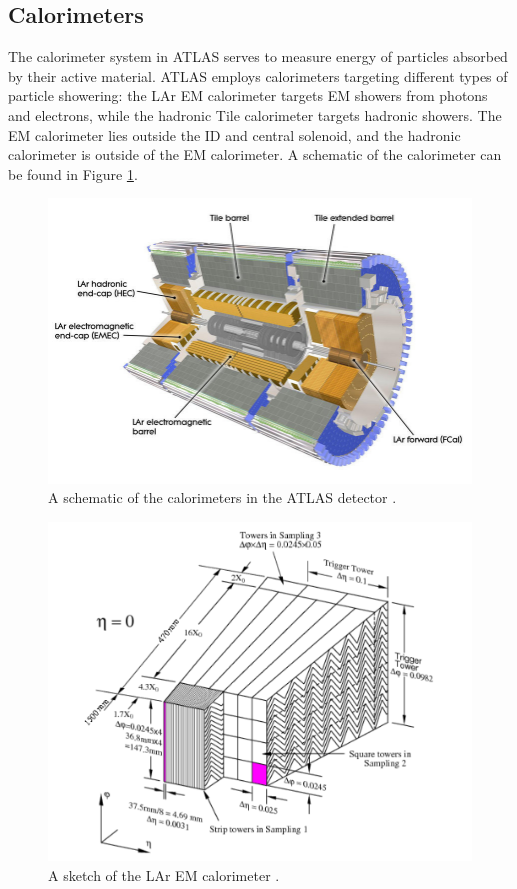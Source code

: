 \subsection{Calorimeters} \label{ssec:calorimeters}
The calorimeter system in ATLAS serves to measure energy of particles absorbed by their active material. ATLAS employs calorimeters targeting different types of particle showering: the \gls{LAr} \gls{EM} calorimeter targets \gls{EM} showers from photons and electrons, while the hadronic Tile calorimeter targets hadronic showers. The \gls{EM} calorimeter lies outside the \gls{ID} and central solenoid, and the hadronic calorimeter is outside of the \gls{EM} calorimeter.  A schematic of the calorimeter can be found in Figure \ref{fig:calorimeter}.


\begin{figure}[!ht]
    \centering
    \includegraphics[width=.7\textwidth]{chapters/chapter2_experiment/images/calorimeter.jpeg}
    \caption{A schematic of the calorimeters in the ATLAS detector \cite{atlas-experiment}.}
    \label{fig:calorimeter}
\end{figure}

\begin{figure}[!ht]
    \centering
    \includegraphics[width=.9\textwidth]{chapters/chapter2_experiment/images/lar.png}
    \caption{A sketch of the \gls{LAr} \gls{EM} calorimeter \cite{lar-tdr}.}
    \label{fig:lar}
\end{figure}

